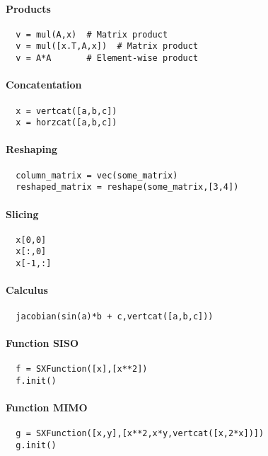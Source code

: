 \documentclass[a4paper,8pt,twocolumn]{article}
\begin{document}
\paragraph{Products}
\begin{verbatim}
  v = mul(A,x)  # Matrix product
  v = mul([x.T,A,x])  # Matrix product
  v = A*A       # Element-wise product
\end{verbatim}

\paragraph{Concatentation}
\begin{verbatim}
  x = vertcat([a,b,c])
  x = horzcat([a,b,c])
\end{verbatim}

\paragraph{Reshaping}
\begin{verbatim}
  column_matrix = vec(some_matrix)
  reshaped_matrix = reshape(some_matrix,[3,4])
\end{verbatim}

\paragraph{Slicing}
\begin{verbatim}
  x[0,0]
  x[:,0]
  x[-1,:]
\end{verbatim}

\paragraph{Calculus}
\begin{verbatim}
  jacobian(sin(a)*b + c,vertcat([a,b,c]))
\end{verbatim}

\paragraph{Function SISO}

\begin{verbatim}
  f = SXFunction([x],[x**2])
  f.init()
\end{verbatim}

\paragraph{Function MIMO}
\begin{verbatim}
  g = SXFunction([x,y],[x**2,x*y,vertcat([x,2*x])])
  g.init()
\end{verbatim}
\end{document}
